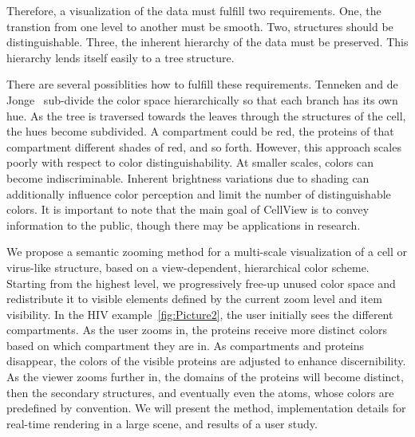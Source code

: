\documentclass[review,journal]{vgtc}         %
\begin{document}
Therefore, a visualization of the data must fulfill two requirements. 
One, the transtion from one level to another must be smooth.
Two, structures should be distinguishable.
Three, the inherent hierarchy of the data must be preserved.
This hierarchy lends itself easily to a tree structure.

There are several possiblities how to fulfill these requirements. 
Tenneken and de Jonge~\cite{tennekes2014tree} sub-divide the color space hierarchically so that each branch has its own hue.
As the tree is traversed towards the leaves through the structures of the cell, the hues become subdivided.
A compartment could be red, the proteins of that compartment different shades of red, and so forth.
However, this approach scales poorly with respect to color distinguishability. At smaller scales, colors can become indiscriminable.
Inherent brightness variations due to shading can additionally influence color perception and limit the number of distinguishable colors.
It is important to note that the main goal of CellView is to convey information to the public, though there may be applications in research.




We propose a semantic zooming method for a multi-scale visualization of a cell or virus-like structure, based on a view-dependent, hierarchical color scheme.
Starting from the highest level, we progressively free-up unused color space and redistribute it to visible elements defined by the current zoom level and item visibility.
In the HIV example~\ref{fig:Picture2}, the user initially sees the different compartments. 
As the user zooms in, the proteins receive more distinct colors based on which compartment they are in. 
As compartments and proteins disappear, the colors of the visible proteins are adjusted to enhance discernibility.  
As the viewer zooms further in, the domains of the proteins will become distinct, then the secondary structures, and eventually even the atoms, whose colors are predefined by convention. 
We will present the method, implementation details for real-time rendering in a large scene, and results of a user study.
\end{document}
